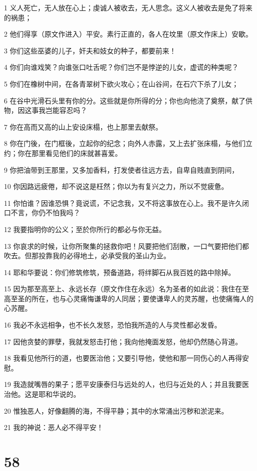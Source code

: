 \par 1 义人死亡，无人放在心上；虔诚人被收去，无人思念。这义人被收去是免了将来的祸患；
\par 2 他们得享（原文作进入）平安。素行正直的，各人在坟里（原文作床上）安歇。
\par 3 你们这些巫婆的儿子，奸夫和妓女的种子，都要前来！
\par 4 你们向谁戏笑？向谁张口吐舌呢？你们岂不是悖逆的儿女，虚谎的种类呢？
\par 5 你们在橡树中间，在各青翠树下欲火攻心；在山谷间，在石穴下杀了儿女；
\par 6 在谷中光滑石头里有你的分。这些就是你所得的分；你也向他浇了奠祭，献了供物，因这事我岂能容忍吗？
\par 7 你在高而又高的山上安设床榻，也上那里去献祭。
\par 8 你在门後，在门框後，立起你的纪念；向外人赤露，又上去扩张床榻，与他们立约；你在那里看见他们的床就甚喜爱。
\par 9 你把油带到王那里，又多加香料，打发使者往远方去，自卑自贱直到阴间，
\par 10 你因路远疲倦，却不说这是枉然；你以为有复兴之力，所以不觉疲惫。
\par 11 你怕谁？因谁恐惧？竟说谎，不记念我，又不将这事放在心上。我不是许久闭口不言，你仍不怕我吗？
\par 12 我要指明你的公义；至於你所行的都必与你无益。
\par 13 你哀求的时候，让你所聚集的拯救你吧！风要把他们刮散，一口气要把他们都吹去。但那投靠我的必得地土，必承受我的圣山为业。
\par 14 耶和华要说：你们修筑修筑，预备道路，将绊脚石从我百姓的路中除掉。
\par 15 因为那至高至上、永远长存（原文作住在永远）名为圣者的如此说：我住在至高至圣的所在，也与心灵痛悔谦卑的人同居；要使谦卑人的灵苏醒，也使痛悔人的心苏醒。
\par 16 我必不永远相争，也不长久发怒，恐怕我所造的人与灵性都必发昏。
\par 17 因他贪婪的罪孽，我就发怒击打他；我向他掩面发怒，他却仍然随心背道。
\par 18 我看见他所行的道，也要医治他；又要引导他，使他和那一同伤心的人再得安慰。
\par 19 我造就嘴唇的果子；愿平安康泰归与远处的人，也归与近处的人；并且我要医治他。这是耶和华说的。
\par 20 惟独恶人，好像翻腾的海，不得平静；其中的水常涌出污秽和淤泥来。
\par 21 我的神说：恶人必不得平安！

\chapter{58}

